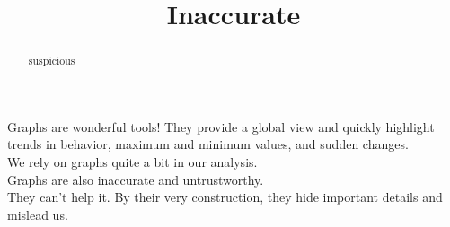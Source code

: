 \documentclass{ximera}
\title{Inaccurate}
\begin{document}
\begin{abstract}
suspicious
\end{abstract}
\maketitle



Graphs are wonderful tools!  They provide a global view and quickly highlight trends in behavior, maximum and minimum values, and sudden changes. \\

We rely on graphs quite a bit in our analysis. \\

Graphs are also inaccurate and untrustworthy. \\

They can't help it.  By their very construction, they hide important details and mislead us.
\end{document}
